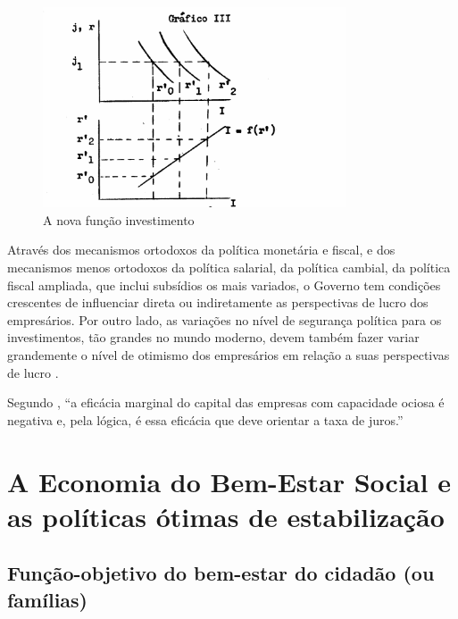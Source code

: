 \documentclass[
	10pt,				%
	openright,			%
	twoside,			%
	a5paper,			%
	english,			%
	french,				%
	spanish,			%
	brazil				%
	]{abntex2}
\renewenvironment{quote}
  {\small\list{}{\rightmargin=0.1cm \leftmargin=4cm}%
   \item\relax}
  {\endlist}
\begin{document}
\begin{figure}[htbp]
\caption{A nova função investimento}\label{eficienciamarginal2}
\begin{center}
\includegraphics[width=0.80000\textwidth]{imagens/imagem_final.png}
\end{center}
\end{figure}

\begin{quote}
Através dos mecanismos ortodoxos da política monetária e fiscal, e dos
mecanismos menos ortodoxos da política salarial, da política cambial, da
política fiscal ampliada, que inclui subsídios os mais variados, o
Governo tem condições crescentes de influenciar direta ou indiretamente
as perspectivas de lucro dos empresários. Por outro lado, as variações
no nível de segurança política para os investimentos, tão grandes no
mundo moderno, devem também fazer variar grandemente o nível de otimismo
dos empresários em relação a suas perspectivas de lucro
\cite[p.~9]{Bresser-Pereira1973}.
\end{quote}

Segundo , ``a eficácia marginal do
capital das empresas com capacidade ociosa é negativa e, pela lógica, é
essa eficácia que deve orientar a taxa de juros.''

\section{A Economia do Bem-Estar Social e as políticas ótimas de
estabilização}\label{a-economia-do-bem-estar-social-e-as-poluxedticas-uxf3timas-de-estabilizauxe7uxe3o}

\subsection{Função-objetivo do bem-estar do cidadão (ou
famílias)}\label{funuxe7uxe3o-objetivo-do-bem-estar-do-cidaduxe3o-ou-famuxedlias}
\end{document}
